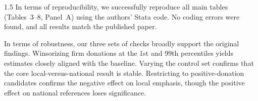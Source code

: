 \documentclass[12pt,a4paper]{article}
\begin{document}
\begin{spacing}{1.5}
In terms of reproducibility, we successfully reproduce all main tables (Tables~3--8, Panel~A) using the authors' Stata code. No coding errors were found, and all results match the published paper.

In terms of robustness, our three sets of checks broadly support the original findings. Winsorizing firm donations at the 1st and 99th percentiles yields estimates closely aligned with the baseline. Varying the control set confirms that the core local-versus-national result is stable. Restricting to positive-donation candidates confirms the negative effect on local emphasis, though the positive effect on national references loses significance.
\end{spacing}

%

\end{document}
